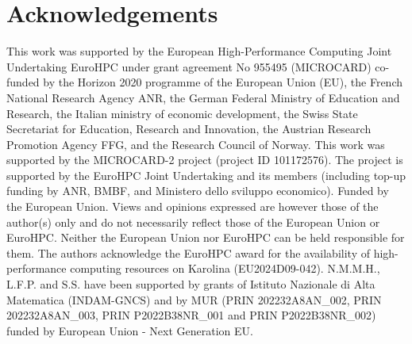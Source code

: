 \section{Acknowledgements}
This work was supported by the European High-Performance Computing Joint Undertaking EuroHPC under grant agreement No 955495 (MICROCARD) co-funded by the Horizon 2020 programme of the European Union (EU), the French National Research Agency ANR, the German Federal Ministry of Education and Research, the Italian ministry of economic development, the Swiss State Secretariat for Education, Research and Innovation, the Austrian Research Promotion Agency FFG, and the Research Council of Norway. \newline
This work was supported by the MICROCARD-2 project (project ID 101172576).
The project is supported by the EuroHPC Joint Undertaking and its
members (including top-up funding by ANR, BMBF, and Ministero dello
sviluppo economico).
Funded by the European Union. Views and opinions expressed are
however those of the author(s) only and do not necessarily reflect
those of the European Union or EuroHPC.  Neither the European Union
nor EuroHPC can be held responsible for them. \newline
%
The authors acknowledge the EuroHPC award for the availability of high-performance computing resources on Karolina (EU2024D09-042).
%
N.M.M.H., L.F.P. and S.S. have been supported by grants of Istituto Nazionale di Alta Matematica (INDAM-GNCS) and by MUR (PRIN 202232A8AN\_002, PRIN 202232A8AN\_003, PRIN P2022B38NR\_001 and PRIN P2022B38NR\_002) funded by European Union - Next Generation EU.
% 